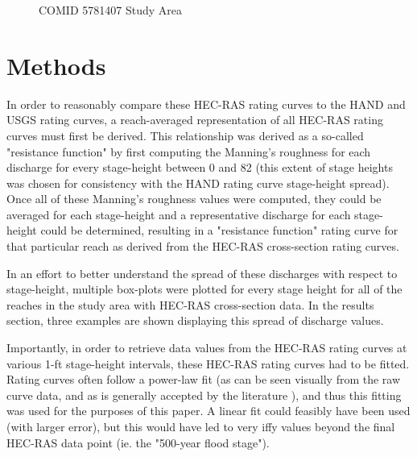 \documentclass[12pt]{article}
\begin{document}
\begin{figure}[h!]
\caption{COMID 5781407 Study Area} \label{fig:5781407_studyarea}
\end{figure}

\section*{Methods}

In order to reasonably compare these HEC-RAS rating curves to the HAND and USGS rating curves, a reach-averaged representation of all HEC-RAS rating curves must first be derived. This relationship was derived as a so-called "resistance function" by first computing the Manning's roughness for each discharge for every stage-height between 0 and 82 (this extent of stage heights was chosen for consistency with the HAND rating curve stage-height spread). Once all of these Manning's roughness values were computed, they could be averaged for each stage-height and a representative discharge for each stage-height could be determined, resulting in a "resistance function" rating curve for that particular reach as derived from the HEC-RAS cross-section rating curves. 

In an effort to better understand the spread of these discharges with respect to stage-height, multiple box-plots were plotted for every stage height for all of the reaches in the study area with HEC-RAS cross-section data. In the results section, three examples are shown displaying this spread of discharge values. 

Importantly, in order to retrieve data values from the HEC-RAS rating curves at various 1-ft stage-height intervals, these HEC-RAS rating curves had to be fitted. Rating curves often follow a power-law fit (as can be seen visually from the raw curve data, and as is generally accepted by the literature \cite{ahgdingman}), and thus this fitting was used for the purposes of this paper. A linear fit could feasibly have been used (with larger error), but this would have led to very iffy values beyond the final HEC-RAS data point (ie. the "500-year flood stage"). 
\end{document}
